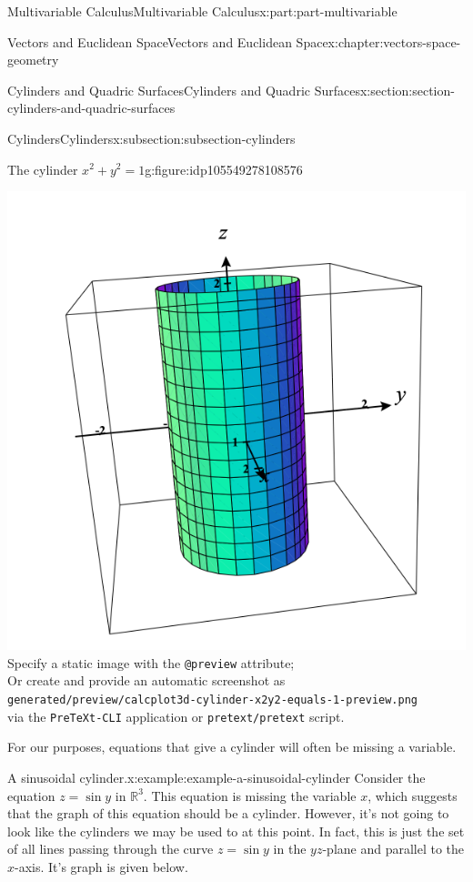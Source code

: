 \documentclass[twoside,10pt,]{book}
\newcommand{\mono}[1]{\texttt{#1}}
\numberwithin{equation}{part}
\newlength{\qrsize}
\newlength{\previewwidth}
\newcommand{\RR}{\mathbb{R}}
\begin{document}
\begin{partptx}{Multivariable Calculus}{}{Multivariable Calculus}{}{}{x:part:part-multivariable}
\begin{chapterptx}{Vectors and Euclidean Space}{}{Vectors and Euclidean Space}{}{}{x:chapter:vectors-space-geometry}
\begin{sectionptx}{Cylinders and Quadric Surfaces}{}{Cylinders and Quadric Surfaces}{}{}{x:section:section-cylinders-and-quadric-surfaces}
\begin{subsectionptx}{Cylinders}{}{Cylinders}{}{}{x:subsection:subsection-cylinders}
\begin{figureptx}{The cylinder \(x^2+y^2=1\)}{g:figure:idp105549278108576}{}
\begin{tcbraster}[raster columns=2, raster column skip=1pt, raster halign=center, raster force size=false, raster left skip=0pt, raster right skip=0pt]
\begin{tcolorbox}[previewstyle, width=\previewwidth]
{\includegraphics[width=0.80\linewidth,height=\qrsize,keepaspectratio]{generated/preview/calcplot3d-cylinder-x2y2-equals-1-preview.png}}%
{\small{}Specify a static image with the \mono{@preview} attribute;\\%
Or create and provide an automatic screenshot as\\%
\mono{generated/preview/calcplot3d-cylinder-x2y2-equals-1-preview.png}\\%
via the \mono{PreTeXt-CLI} application or \mono{pretext/pretext} script.}%
\end{tcolorbox}%
\begin{tcolorbox}[qrstyle]%
{\hypersetup{urlcolor=black}}%
\end{tcolorbox}%
\end{tcbraster}%
\tcblower
\end{figureptx}%
For our purposes, equations that give a cylinder will often be missing a variable.%
\begin{example}{A sinusoidal cylinder.}{x:example:example-a-sinusoidal-cylinder}%
Consider the equation \(z = \sin y\) in \(\RR^{3}\). This equation is missing the variable \(x\), which suggests that the graph of this equation should be a cylinder. However, it's not going to look like the cylinders we may be used to at this point. In fact, this is just the set of all lines passing through the curve \(z=\sin y\) in the \(yz\)-plane and parallel to the \(x\)-axis. It's graph is given below.%

\end{example}
\end{subsectionptx}
\end{sectionptx}
\end{chapterptx}
\end{partptx}
\end{document}
